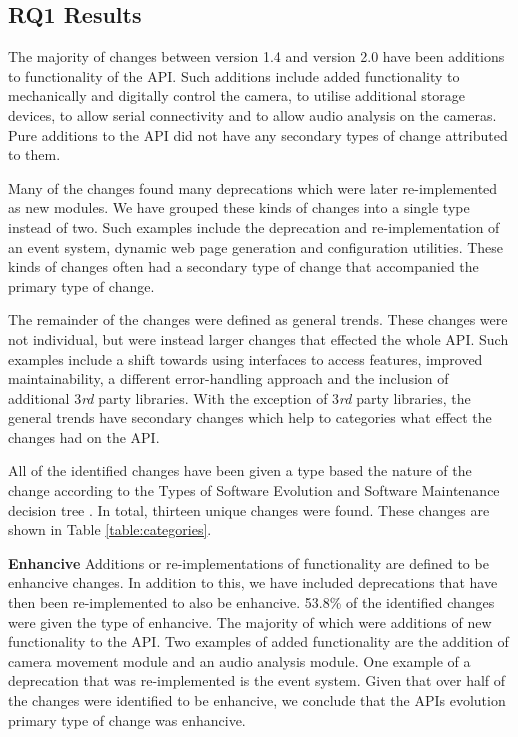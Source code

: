 \documentclass{sig-alternate}
\begin{document}
\subsection{RQ1 Results} \label{results_rq1}

The majority of changes between version 1.4 and version 2.0 have been additions to functionality of the API. Such additions include added functionality to mechanically and digitally control the camera, to utilise additional storage devices, to allow serial connectivity and to allow audio analysis on the cameras. Pure additions to the API did not have any secondary types of change attributed to them.

Many of the changes found many deprecations which were later re-implemented as new modules. We have grouped these kinds of changes into a single type instead of two. Such examples include the deprecation and re-implementation of an event system, dynamic web page generation and configuration utilities. These kinds of changes often had a secondary type of change that accompanied the primary type of change.

The remainder of the changes were defined as general trends. These changes were not individual, but were instead larger changes that effected the whole API. Such examples include a shift towards using interfaces to access features, improved maintainability, a different error-handling approach and the inclusion of additional 3\textit{rd} party libraries. With the exception of 3\textit{rd} party libraries, the general trends have secondary changes which help to categories what effect the changes had on the API.

All of the identified changes have been given a type based the nature of the change according to the Types of Software Evolution and Software Maintenance decision tree \cite{chapin2001types}. In total, thirteen unique changes were found. These changes are shown in Table \ref{table:categories}.

\smallskip \noindent
\textbf{Enhancive  }
Additions or re-implementations of functionality are defined to be enhancive changes. In addition to this, we have included deprecations that have then been re-implemented to also be enhancive.
53.8\% of the identified changes were given the type of enhancive. The majority of which were additions of new functionality to the API. Two examples of added functionality are the addition of camera movement module and an audio analysis module. One example of a deprecation that was re-implemented is the event system.
Given that over half of the changes were identified to be enhancive, we conclude that the APIs evolution primary type of change was enhancive. 
\end{document}
